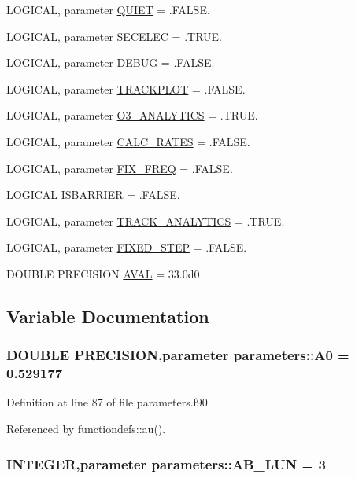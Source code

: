 \begin{DoxyCompactItemize}
$$LOGICAL, parameter \hyperlink{namespaceparameters_a76f6259a6055e7668847d95bb689fbb9}{QUIET} = .FALSE.
\item 
LOGICAL, parameter \hyperlink{namespaceparameters_ae0f23566499e10756f5a93adb6160899}{SECELEC} = .TRUE.
\item 
LOGICAL, parameter \hyperlink{namespaceparameters_a555f6d9a3fe1c11f68f18ddeb2111ffa}{DEBUG} = .FALSE.
\item 
LOGICAL, parameter \hyperlink{namespaceparameters_a687b46ca494c1998df909a6461e3b535}{TRACKPLOT} = .FALSE.
\item 
LOGICAL, parameter \hyperlink{namespaceparameters_aba22684f89f881fe4dc9d78bd30d6f5b}{O3\_\-ANALYTICS} = .TRUE.
\item 
LOGICAL, parameter \hyperlink{namespaceparameters_abf0f37eb423e843da77558c657a43220}{CALC\_\-RATES} = .FALSE.
\item 
LOGICAL, parameter \hyperlink{namespaceparameters_a557f350ba21ed1a34656e6cce03635fb}{FIX\_\-FREQ} = .FALSE.
\item 
LOGICAL \hyperlink{namespaceparameters_a3353739a07b03f983c7528bce590be69}{ISBARRIER} = .FALSE.
\item 
LOGICAL, parameter \hyperlink{namespaceparameters_ad4575bbb41153e584b501a6238bd4b6c}{TRACK\_\-ANALYTICS} = .TRUE.
\item 
LOGICAL, parameter \hyperlink{namespaceparameters_a1a34e9253cb6baa25fe90345e4a0ceb2}{FIXED\_\-STEP} = .FALSE.
\item 
DOUBLE PRECISION \hyperlink{namespaceparameters_ae2d7b8b9e8df09f194ff75d43b02afbb}{AVAL} = 33.0d0
\end{DoxyCompactItemize}


\subsection{Variable Documentation}
\hypertarget{namespaceparameters_a04ab380d92467d452e23f88704ceb37a}{
\subsubsection[{A0}]{\setlength{\rightskip}{0pt plus 5cm}DOUBLE PRECISION,parameter {\bf parameters::A0} = 0.529177}}
\label{namespaceparameters_a04ab380d92467d452e23f88704ceb37a}


Definition at line 87 of file parameters.f90.

Referenced by functiondefs::au().\hypertarget{namespaceparameters_a6b5a8618cdb0c5ecfd24827177f53d22}{
\subsubsection[{AB\_\-LUN}]{\setlength{\rightskip}{0pt plus 5cm}INTEGER,parameter {\bf parameters::AB\_\-LUN} = 3}}
\label{namespaceparameters_a6b5a8618cdb0c5ecfd24827177f53d22}


